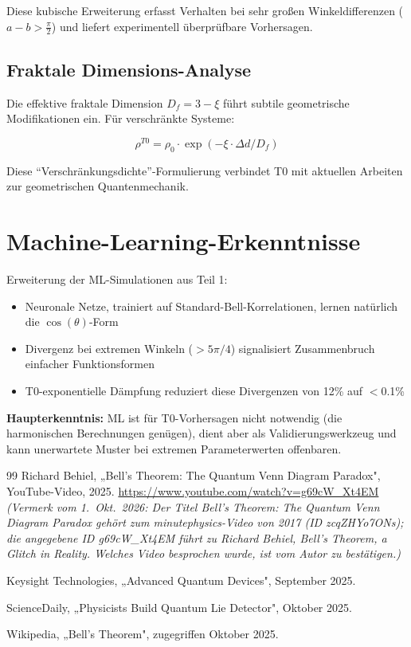 Diese kubische Erweiterung erfasst Verhalten bei sehr großen Winkeldifferenzen ($a-b > \frac{\pi}{2}$) und liefert experimentell überprüfbare Vorhersagen.

\subsection{Fraktale Dimensions-Analyse}

Die effektive fraktale Dimension $D_f = 3 - \xi$ führt subtile geometrische Modifikationen ein. Für verschränkte Systeme:

\begin{equation}
\rho^{T0} = \rho_0 \cdot \exp(-\xi \cdot \Delta d / D_f)
\end{equation}

Diese ``Verschränkungsdichte''-Formulierung verbindet T0 mit aktuellen Arbeiten zur geometrischen Quantenmechanik.

\section{Machine-Learning-Erkenntnisse}
\label{sec:ml_extended}

Erweiterung der ML-Simulationen aus Teil 1:

\begin{itemize}
\item Neuronale Netze, trainiert auf Standard-Bell-Korrelationen, lernen natürlich die $\cos(\theta)$-Form
\item Divergenz bei extremen Winkeln ($> 5\pi/4$) signalisiert Zusammenbruch einfacher Funktionsformen
\item T0-exponentielle Dämpfung reduziert diese Divergenzen von 12\% auf $<$0.1\%
\end{itemize}

\textbf{Haupterkenntnis:} ML ist für T0-Vorhersagen nicht notwendig (die harmonischen Berechnungen genügen), dient aber als Validierungswerkzeug und kann unerwartete Muster bei extremen Parameterwerten offenbaren.
\begin{thebibliography}{99}
	Richard Behiel, „Bell's Theorem: The Quantum Venn Diagram Paradox", 
	YouTube-Video, 2025. 
	\url{https://www.youtube.com/watch?v=g69cW_Xt4EM}\\
	\textit{(Vermerk vom 1.~Okt.~2026: Der Titel \glqq Bell's Theorem: The Quantum Venn Diagram Paradox\grqq{} gehört zum minutephysics-Video von 2017 (ID zcqZHYo7ONs); die angegebene ID g69cW\_Xt4EM führt zu Richard Behiel, \glqq Bell's Theorem, a Glitch in Reality\grqq{}. Welches Video besprochen wurde, ist vom Autor zu bestätigen.)}
	
	Keysight Technologies, „Advanced Quantum Devices", September 2025.
	
	ScienceDaily, „Physicists Build Quantum Lie Detector", Oktober 2025.
	
	Wikipedia, „Bell's Theorem", zugegriffen Oktober 2025.
\end{thebibliography}